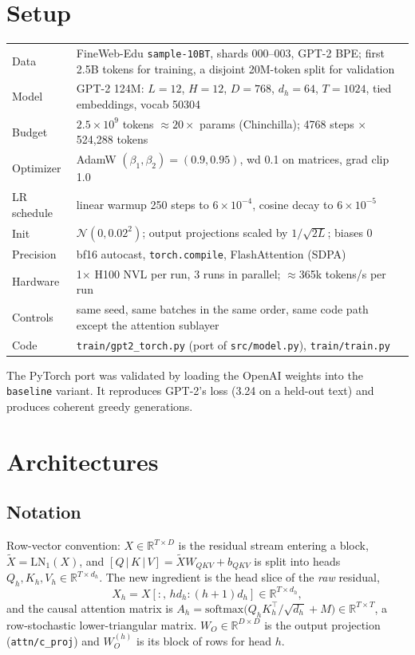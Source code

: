 \documentclass[11pt]{article}
\newcommand{\code}[1]{\texttt{#1}}
\begin{document}
\section{Setup}
{\small
\begin{tabularx}{\linewidth}{@{}lX@{}}
Data & FineWeb-Edu \code{sample-10BT}, shards 000--003, GPT-2 BPE; first 2.5B tokens for training,
a disjoint 20M-token split for validation \\
Model & GPT-2 124M: $L{=}12$, $H{=}12$, $D{=}768$, $d_h{=}64$, $T{=}1024$, tied embeddings, vocab 50304 \\
Budget & $2.5\times10^9$ tokens $\approx 20\times$ params (Chinchilla); 4768 steps $\times$ 524{,}288 tokens \\
Optimizer & AdamW $(\beta_1,\beta_2){=}(0.9,0.95)$, wd 0.1 on matrices, grad clip 1.0 \\
LR schedule & linear warmup 250 steps to $6\times10^{-4}$, cosine decay to $6\times10^{-5}$ \\
Init & $\mathcal N(0, 0.02^2)$; output projections scaled by $1/\sqrt{2L}$; biases 0 \\
Precision & bf16 autocast, \code{torch.compile}, FlashAttention (SDPA) \\
Hardware & 1$\times$ H100 NVL per run, 3 runs in parallel; $\approx$365k tokens/s per run \\
Controls & same seed, same batches in the same order, same code path except the attention sublayer \\
Code & \code{train/gpt2\_torch.py} (port of \code{src/model.py}), \code{train/train.py} \\
\end{tabularx}}

The PyTorch port was validated by loading the OpenAI weights into the \code{baseline} variant. It
reproduces GPT-2's loss (3.24 on a held-out text) and produces coherent greedy generations.

\section{Architectures}
\subsection{Notation}
Row-vector convention: $X\in\mathbb R^{T\times D}$ is the residual stream entering a block, $\tilde X =
\mathrm{LN}_1(X)$, and $[Q\,|\,K\,|\,V] = \tilde X W_{QKV} + b_{QKV}$ is split into heads $Q_h,K_h,V_h\in\mathbb
R^{T\times d_h}$. The new ingredient is the head slice of the \emph{raw} residual,
\[
X_h = X[:,\,h d_h:(h{+}1) d_h] \in \mathbb R^{T\times d_h},
\]
and the causal attention matrix is $A_h = \mathrm{softmax}\big(Q_hK_h^\top/\sqrt{d_h} + M\big)\in\mathbb
R^{T\times T}$, a row-stochastic lower-triangular matrix. $W_O\in\mathbb R^{D\times D}$ is the output
projection (\code{attn/c\_proj}) and $W_O^{(h)}$ is its block of rows for head $h$.
\end{document}
